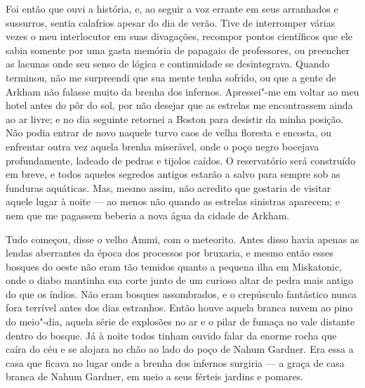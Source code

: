 Foi então que ouvi a história, e, ao seguir a voz errante em seus
arranhados e sussurros, sentia calafrios apesar do dia de verão. Tive de
interromper várias vezes o meu interlocutor em suas divagações, recompor
pontos científicos que ele sabia somente por uma gasta memória de
papagaio de professores, ou preencher as lacunas onde seu senso de
lógica e continuidade se desintegrava. Quando terminou, não me
surpreendi que sua mente tenha sofrido, ou que a gente de Arkham não
falasse muito da brenha dos infernos. Apressei"-me em voltar ao meu hotel
antes do pôr do sol, por não desejar que as estrelas me encontrassem
ainda ao ar livre; e no dia seguinte retornei a Boston para desistir da
minha posição. Não podia entrar de novo naquele turvo caos de velha
floresta e encosta, ou enfrentar outra vez aquela brenha miserável, onde
o poço negro bocejava profundamente, ladeado de pedras e tijolos caídos.
O reservatório será construído em breve, e todos aqueles segredos
antigos estarão a salvo para sempre sob as funduras aquáticas. Mas,
mesmo assim, não acredito que gostaria de visitar aquele lugar à noite
--- ao menos não quando as estrelas sinistras aparecem; e nem que me
pagassem beberia a nova água da cidade de Arkham.

Tudo começou, disse o velho Ammi, com o meteorito. Antes disso havia
apenas as lendas aberrantes da época dos processos por bruxaria, e mesmo
então esses bosques do oeste não eram tão temidos quanto a pequena ilha
em Miskatonic, onde o diabo mantinha sua corte junto de um curioso altar
de pedra mais antigo do que os índios. Não eram bosques assombrados, e o
crepúsculo fantástico nunca fora terrível antes dos dias estranhos.
Então houve aquela branca nuvem ao pino do meio"-dia, aquela série de
explosões no ar e o pilar de fumaça no vale distante dentro do bosque.
Já à noite todos tinham ouvido falar da enorme rocha que caíra do céu e
se alojara no chão ao lado do poço de Nahum Gardner. Era essa a casa que
ficava no lugar onde a brenha dos infernos surgiria --- a graça de casa
branca de Nahum Gardner, em meio a seus férteis jardins e pomares.

